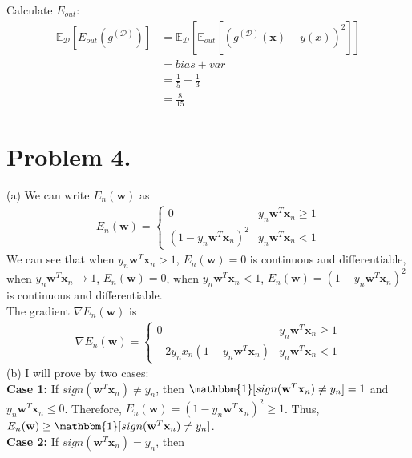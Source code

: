 \documentclass{article}
\begin{document}
    Calculate $E_{out}$:
    \begin{align*} 
        \mathbb{E}_{\mathcal{D}}[E_{out}(g^{(\mathcal{D})})] & = 
        \mathbb{E}_{\mathcal{D}}[\mathbb{E}_{out}[(g^{(\mathcal{D})}(\mathbf{x}) - y(x))^2]]\\
        & = bias + var\\
        & = \frac{1}{5} + \frac{1}{3}\\
        & = \frac{8}{15}
    \end{align*}

    \section*{Problem 4.}
    (a) We can write $E_n(\mathbf{w})$ as 
    \begin{align*} 
        E_n(\mathbf{w}) = 
            \begin{cases}
                0 & y_n\mathbf{w}^T\mathbf{x}_n \geq 1\\
                (1 - y_n\mathbf{w}^T\mathbf{x}_n)^2 & y_n\mathbf{w}^T\mathbf{x}_n < 1
            \end{cases}
    \end{align*}
    We can see that when $y_n\mathbf{w}^T\mathbf{x}_n > 1$, $E_n(\mathbf{w}) = 0$ is continuous and differentiable, 
    when $y_n\mathbf{w}^T\mathbf{x}_n \to 1$, $E_n(\mathbf{w}) = 0$, when $y_n\mathbf{w}^T\mathbf{x}_n < 1$, 
    $E_n(\mathbf{w}) = (1 - y_n\mathbf{w}^T\mathbf{x}_n)^2$ is continuous and differentiable.\\
    The gradient $\nabla E_n(\mathbf{w})$ is
    \begin{align*} 
        \nabla E_n(\mathbf{w}) = 
            \begin{cases}
                0 & y_n\mathbf{w}^T\mathbf{x}_n \geq 1\\
                -2y_nx_n(1 - y_n\mathbf{w}^T\mathbf{x}_n) & y_n\mathbf{w}^T\mathbf{x}_n < 1
            \end{cases}
    \end{align*}
    (b) I will prove by two cases:\\
    \textbf{Case 1:} If $sign(\mathbf{w}^T\mathbf{x}_n) \neq y_n$, then 
    $\mathbbm{1}[sign(\mathbf{w}^T\mathbf{x}_n) \neq y_n] = 1$ and $y_n\mathbf{w}^T\mathbf{x}_n \leq 0$. Therefore, 
    $E_n(\mathbf{w}) = (1 - y_n\mathbf{w}^T\mathbf{x}_n)^2 \geq 1$. Thus, $E_n(\mathbf{w}) \geq 
    \mathbbm{1}[sign(\mathbf{w}^T\mathbf{x}_n) \neq y_n]$.\\
    \textbf{Case 2:} If $sign(\mathbf{w}^T\mathbf{x}_n) = y_n$, then
\end{document}
